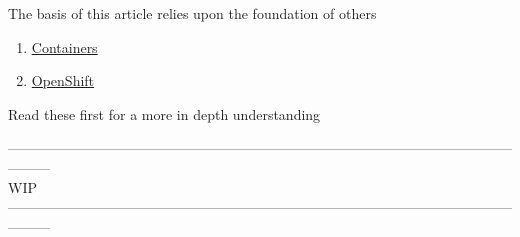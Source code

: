 \documentclass{article}
\begin{document}
The basis of this article relies upon the foundation of others
\begin{enumerate}[(1)]
 \item \href{https://kyguy.github.io/src/containers/containers.html}{Containers}
 \item \href{https://kyguy.github.io/src/openshift/openshift.html}{OpenShift}
\end{enumerate}
Read these first for a more in depth understanding \


--------------------------------------------------------------------------------------------------------------------- \\
 WIP \\
--------------------------------------------------------------------------------------------------------------------- \\




%
\end{document}
